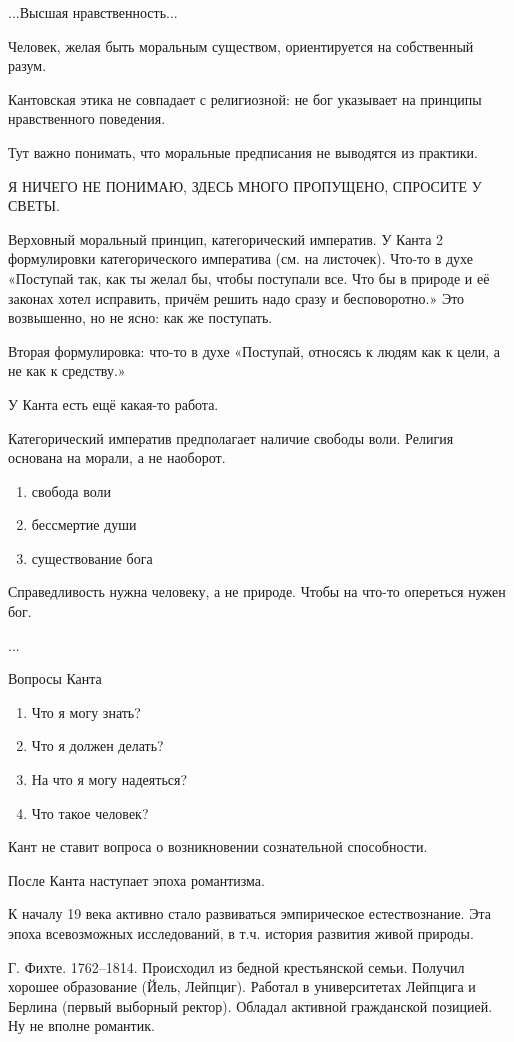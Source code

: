 ...Высшая нравственность...

Человек, желая быть моральным существом, ориентируется на собственный разум.

Кантовская этика не совпадает с религиозной: не бог указывает на принципы нравственного поведения.

Тут важно понимать, что моральные предписания не выводятся из практики.

Я НИЧЕГО НЕ ПОНИМАЮ, ЗДЕСЬ МНОГО ПРОПУЩЕНО, СПРОСИТЕ У СВЕТЫ.

Верховный моральный принцип, категорический императив.
У Канта 2 формулировки категорического императива (см. на листочек). Что-то в духе «Поступай так, как ты желал бы, чтобы поступали все. Что бы в природе и её законах хотел исправить, причём решить надо сразу и бесповоротно.»  Это возвышенно, но не ясно: как же поступать.

Вторая формулировка: что-то в духе «Поступай, относясь к людям как к цели, а не как к средству.»

У Канта есть ещё какая-то работа.

Категорический императив предполагает наличие свободы воли. Религия основана на морали, а не наоборот. 

\begin{enumerate}
	\item свобода воли
	\item бессмертие души
	\item существование бога
\end{enumerate}


Справедливость нужна человеку, а не природе. Чтобы на что-то опереться нужен бог.

...

Вопросы Канта
\begin{enumerate}
	\item Что я могу знать?
	\item Что я должен делать?
	\item На что я могу надеяться?
	\item Что такое человек?
\end{enumerate}

Кант не ставит вопроса о возникновении сознательной способности.

После Канта наступает эпоха романтизма. 

К началу 19 века активно стало развиваться эмпирическое естествознание. Эта эпоха всевозможных исследований, в т.ч. история развития живой природы.

Г. Фихте. 1762--1814. Происходил из бедной крестьянской семьи. Получил хорошее образование (Йель, Лейпциг). Работал в университетах Лейпцига и Берлина (первый выборный ректор). Обладал активной гражданской позицией.
Ну не вполне романтик. 

